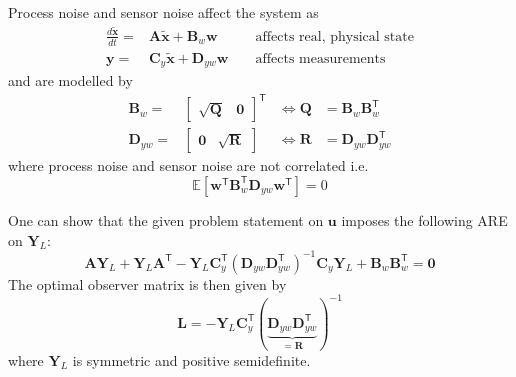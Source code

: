 Process noise and sensor noise affect the system as
\begin{align*}
    \frac{d\tilde{\mathbf{x}} }{dt}= & \mathbf{A}\tilde{\mathbf{x}}+\mathbf{B}_{w} \mathbf{w}   &  & \text{ affects real, physical state} \\
    \mathbf{y}=                      & \mathbf{C}_y\tilde{\mathbf{x}}+\mathbf{D}_{yw}\mathbf{w} &  & \text{ affects measurements}
\end{align*}
and are modelled by
\begin{align*}
    \mathbf{B}_w=    & \begin{bmatrix}\sqrt{\mathbf{Q}}&\mathbf{0}\end{bmatrix}^{\mathsf{T}} & \Leftrightarrow \mathbf{Q}          & = \mathbf{B}_w\mathbf{B}_w^{\mathsf{T}}       \\
    \mathbf{D}_{yw}= & \begin{bmatrix}\mathbf{0}&\sqrt{\mathbf{R}}\end{bmatrix}              & \Leftrightarrow \mathbf{\mathbf{R}} & = \mathbf{D}_{yw}\mathbf{D}_{yw}^{\mathsf{T}}
\end{align*}
where process noise and sensor noise are not correlated i.e.
\begin{equation*}
    \mathbb{E}\left[\mathbf{w}^{\mathsf{T}} \mathbf{B}_w^{\mathsf{T}} \mathbf{D}_{yw}\mathbf{w}^{\mathsf{T}}\right]=0
\end{equation*}

\newpar{}

One can show that the given problem statement on $\mathbf{u}$ imposes the following ARE on $\mathbf{Y}_L$:
\begin{equation*}
    \mathbf{A}\mathbf{Y}_L + \mathbf{Y}_L \mathbf{A}^{\mathsf{T}} - \mathbf{Y}_L \mathbf{C}_y^{\mathsf{T}}{\left(\mathbf{D}_{yw}\mathbf{D}_{yw}^{\mathsf{T}}\right)}^{-1} \mathbf{C}_y \mathbf{Y}_L + \mathbf{B}_w\mathbf{B}_w^{\mathsf{T}} = \mathbf{0}
\end{equation*}
The optimal observer matrix is then given by
\begin{equation*}
    \mathbf{L} = -\mathbf{Y}_L\mathbf{C}_y^{\mathsf{T}}{(\underbrace{\mathbf{D}_{yw}\mathbf{D}_{yw}^{\mathsf{T}}}_{=\mathbf{R}})}^{-1}
\end{equation*}
where $\mathbf{Y}_L$ is symmetric and positive semidefinite.

